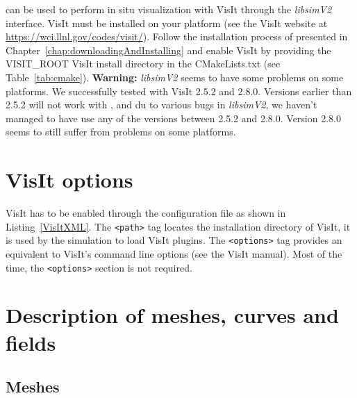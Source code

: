 \Damaris{} can be used to perform in situ visualization with VisIt through the \emph{libsimV2} interface. 
VisIt must be installed on your platform (see the VisIt website at \url{https://wci.llnl.gov/codes/visit/}).
Follow the installation process of \Damaris{} presented in Chapter~\ref{chap:downloadingAndInstalling}
and enable VisIt by providing the VISIT\_ROOT 
VisIt install directory in the CMakeLists.txt (see Table~\ref{tab:cmake}).
\textbf{Warning:} \emph{libsimV2} seems to have some problems on some platforms. We successfully
tested \Damaris{} with VisIt 2.5.2 and 2.8.0. Versions earlier than 2.5.2 will not work with \Damaris{},
and du to various bugs in \emph{libsimV2}, we haven't managed to have \Damaris{} use any of the
versions between 2.5.2 and 2.8.0. Version 2.8.0 seems to still suffer from problems on some platforms.

\section{VisIt options}

VisIt has to be enabled through the configuration file as shown in
Listing~\ref{VisItXML}. The \texttt{<path>} tag locates the installation
directory of VisIt, it is used by the simulation to load VisIt plugins.
The \texttt{<options>} tag provides an equivalent to VisIt's command line options (see
the VisIt manual). Most of the time, the \texttt{<options>} section is not required.

\noindent\begin{minipage}{\textwidth}
\vspace{0.5cm}

\end{minipage}

\section{Description of meshes, curves and fields}

\subsection{Meshes}

